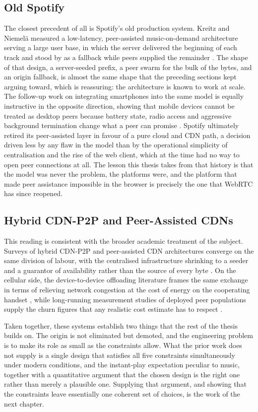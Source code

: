 \subsection{Old Spotify}
\indent \par The closest precedent of all is Spotify's old production system. Kreitz and Niemel\"a measured a low-latency, peer-assisted music-on-demand architecture serving a large user base, in which the server delivered the beginning of each track and stood by as a fallback while peers supplied the remainder \cite{spotify_p2p}. The shape of that design, a server-seeded prefix, a peer swarm for the bulk of the bytes, and an origin fallback, is almost the same shape that the preceding sections kept arguing toward, which is reassuring: the architecture is known to work at scale. The follow-up work on integrating smartphones into the same model is equally instructive in the opposite direction, showing that mobile devices cannot be treated as desktop peers because battery state, radio access and aggressive background termination change what a peer can promise \cite{spotify_mobile_p2p}. Spotify ultimately retired its peer-assisted layer in favour of a pure cloud and CDN path, a decision driven less by any flaw in the model than by the operational simplicity of centralisation and the rise of the web client, which at the time had no way to open peer connections at all. The lesson this thesis takes from that history is that the model was never the problem, the platforms were, and the platform that made peer assistance impossible in the browser is precisely the one that WebRTC has since reopened.

\subsection{Hybrid CDN-P2P and Peer-Assisted CDNs}
\indent \par This reading is consistent with the broader academic treatment of the subject. Surveys of hybrid CDN-P2P and peer-assisted CDN architectures converge on the same division of labour, with the centralised infrastructure shrinking to a seeder and a guarantor of availability rather than the source of every byte \cite{hybrid_cdn_p2p,pa_cdn_survey}. On the cellular side, the device-to-device offloading literature frames the same exchange in terms of relieving network congestion at the cost of energy on the cooperating handset \cite{d2d_survey}, while long-running measurement studies of deployed peer populations supply the churn figures that any realistic cost estimate has to respect \cite{measurement_p2p}.


\indent \par Taken together, these systems establish two things that the rest of the thesis builds on. The origin is not eliminated but demoted, and the engineering problem is to make its role as small as the constraints allow. What the prior work does not supply is a single design that satisfies all five constraints simultaneously under modern conditions, and the instant-play expectation peculiar to music, together with a quantitative argument that the chosen design is the right one rather than merely a plausible one. Supplying that argument, and showing that the constraints leave essentially one coherent set of choices, is the work of the next chapter.
